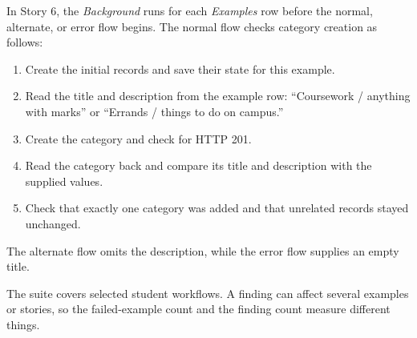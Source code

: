 In Story 6, the \textit{Background} runs for each \textit{Examples} row before the normal, alternate,
or error flow begins. The normal flow checks category creation as follows:
\begin{enumerate}[leftmargin=1.6em,itemsep=2bp,topsep=4bp]
\item Create the initial records and save their state for this example.
\item Read the title and description from the example row: ``Coursework / anything with marks'' or ``Errands / things to do on campus.''
\item Create the category and check for HTTP 201.
\item Read the category back and compare its title and description with the supplied values.
\item Check that exactly one category was added and that unrelated records stayed unchanged.
\end{enumerate}
The alternate flow omits the description, while the error flow supplies an empty
title.

The suite covers selected student workflows. A finding can affect several
examples or stories, so the failed-example count and the finding count measure
different things.
